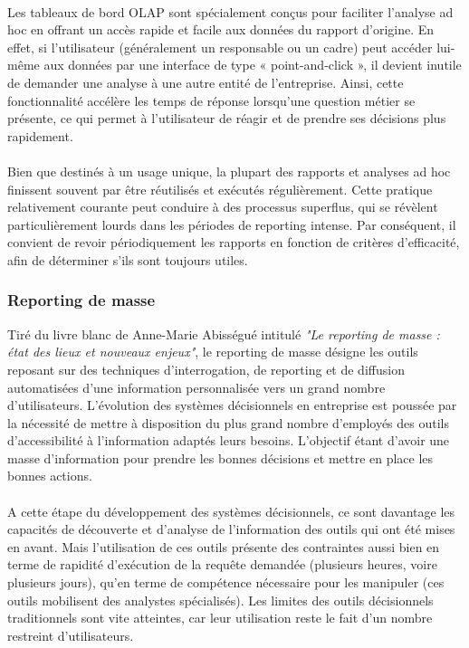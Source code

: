 \paragraph{}
Les tableaux de bord OLAP sont spécialement conçus pour faciliter l'analyse ad hoc en offrant un accès rapide et facile aux données du rapport d'origine. En effet, si l'utilisateur (généralement un responsable ou un cadre) peut accéder lui-même aux données par une interface de type « point-and-click », il devient inutile de demander une analyse à une autre entité de l'entreprise. Ainsi, cette fonctionnalité accélère les temps de réponse lorsqu'une question métier se présente, ce qui permet à l'utilisateur de réagir et de prendre ses décisions plus rapidement.
\paragraph{}
Bien que destinés à un usage unique, la plupart des rapports et analyses ad hoc finissent souvent par être réutilisés et exécutés régulièrement. Cette pratique relativement courante peut conduire à des processus superflus, qui se révèlent particulièrement lourds dans les périodes de reporting intense. Par conséquent, il convient de revoir périodiquement les rapports en fonction de critères d'efficacité, afin de déterminer s'ils sont toujours utiles.

\subsubsection{Reporting de masse}
Tiré du livre blanc de Anne-Marie Abisségué intitulé \textit{"Le reporting de masse : état des lieux et nouveaux enjeux"}, le reporting de masse désigne les outils reposant sur des techniques d'interrogation, de reporting et de diffusion automatisées d'une information personnalisée vers un grand nombre d'utilisateurs. L'évolution des systèmes décisionnels en entreprise est poussée par la nécessité de mettre à disposition du plus grand nombre d’employés des outils d’accessibilité à l’information adaptés leurs besoins. L'objectif étant d'avoir une masse d’information pour prendre les bonnes décisions et mettre en place les bonnes actions.
\paragraph{}
A cette étape du développement des systèmes décisionnels, ce sont davantage les capacités de découverte et d'analyse de l'information des outils qui ont été mises en avant. Mais l'utilisation de ces outils présente des contraintes aussi bien en terme de rapidité d'exécution de la requête demandée (plusieurs heures, voire plusieurs jours), qu'en terme de compétence nécessaire pour les manipuler (ces outils mobilisent des analystes spécialisés). Les limites des outils décisionnels traditionnels sont vite atteintes, car leur utilisation reste le fait d'un nombre restreint d'utilisateurs.

